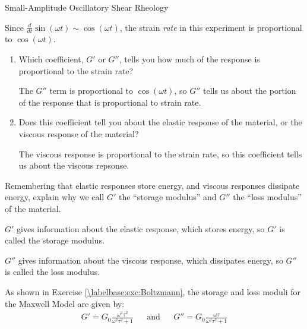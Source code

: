 \begin{activity}[extension]{Small-Amplitude Oscillatory Shear Rheology}
\begin{ctqs}
\begin{enumerate}
			\end{enumerate}
		
		\question Since $\frac{d}{dt}\sin(\omega t) \sim \cos(\omega t)$, the strain \emph{rate} in this experiment is proportional to $\cos(\omega t)$.
		
			\begin{enumerate}
		
				\item Which coefficient, $G'$ or $G''$, tells you how much of the response is proportional to the strain rate?
	
					\begin{solution}[1.1in]
						The $G''$ term is proportional to $\cos(\omega t)$, so $G''$ tells us about the portion of the response that is proportional to strain rate.
					\end{solution}
		
				\item Does this coefficient tell you about the elastic response of the material, or the viscous response of the material?
	
					\begin{solution}[1.1in]
					
						The viscous response is proportional to the strain rate, so this coefficient tells us about the viscous repsonse.
					
					\end{solution}
					
			\end{enumerate}
		
		\question Remembering that elastic responses store energy, and viscous responses dissipate energy, explain why we call $G'$ the ``storage modulus'' and $G''$ the ``loss modulus'' of the material.
	
					\begin{solution}[2in]
					
						$G'$ gives information about the elastic response, which stores energy, so $G'$ is called the storage modulus.
						
						$G''$ gives information about the viscous response, which dissipates energy, so $G''$ is called the loss modulus.
					\end{solution}
			
\end{ctqs}

\clearpage
\begin{model}
\label{\labelbase:mdl:dynamicmoduli}
	As shown in Exercise \ref{\labelbase:exc:Boltzmann}, the storage and loss moduli for the Maxwell Model are given by:
	\begin{align*}
		G' = G_0 \frac{\omega^2 \tau^2}{\omega^2 \tau^2 + 1} && \text{and} && G'' = G_0 \frac{\omega \tau}{\omega^2 \tau^2 + 1}
	\end{align*}
	

\end{model}
\end{activity}
